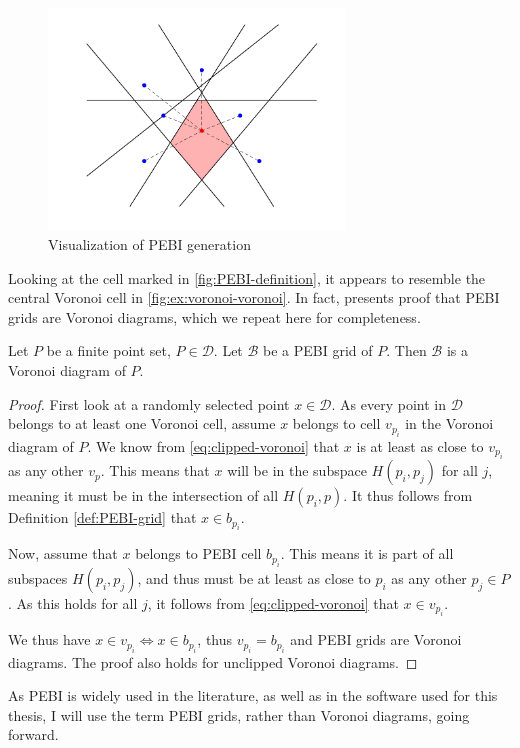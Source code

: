 \begin{figure}[ht]
    \centering
    \includegraphics[width=0.7\textwidth]{report/Images/Theory/PEBI_definition.png}
    \caption{Visualization of PEBI generation}
    \label{fig:PEBI-definition}
\end{figure}

Looking at the cell marked in \autoref{fig:PEBI-definition}, it appears to resemble the central Voronoi cell in \autoref{fig:ex:voronoi-voronoi}. In fact, \textcite{UPR_chapter} presents proof that PEBI grids are Voronoi diagrams, which we repeat here for completeness.

\begin{theorem}
\label{theorem:PEBI-voronoi}
Let $P$ be a finite point set, $P \in \mathcal{D}$. Let $\mathcal{B}$ be a PEBI grid of $P$. Then $\mathcal{B}$ is a Voronoi diagram of $P$.
\end{theorem}
\begin{proof}
First look at a randomly selected point $x \in \mathcal{D}$. As every point in $\mathcal{D}$ belongs to at least one Voronoi cell, assume $x$ belongs to cell $v_{p_i}$ in the Voronoi diagram of $P$. We know from  \autoref{eq:clipped-voronoi} that $x$ is at least as close to $v_{p_i}$ as any other $v_p$. This means that $x$ will be in the subspace $H(p_i, p_j)$ for all $j$, meaning it must be in the intersection of all $H(p_i, p)$. It thus follows from Definition \ref{def:PEBI-grid} that $x \in b_{p_i}$.

Now, assume that $x$ belongs to PEBI cell $b_{p_i}$. This means it is part of all subspaces $H(p_i, p_j)$, and thus must be at least as close to $p_i$ as any other $p_j \in P$. As this holds for all $j$, it follows from \autoref{eq:clipped-voronoi} that $x \in v_{p_i}$.

We thus have $x \in v_{p_i} \iff x \in b_{p_i}$, thus $v_{p_i} = b_{p_i}$ and PEBI grids are Voronoi diagrams. The proof also holds for unclipped Voronoi diagrams.
\end{proof}

As PEBI is widely used in the literature, as well as in the software used for this thesis, I will use the term PEBI grids, rather than Voronoi diagrams, going forward.

